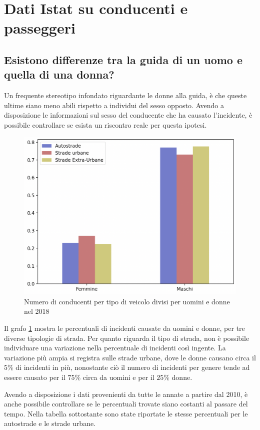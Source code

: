 \documentclass[a4paper,12pt]{report}
\begin{document}
\section{Dati Istat su conducenti e passeggeri}

\subsection{Esistono differenze tra la guida di un uomo e quella di una donna?}

Un frequente stereotipo infondato riguardante le donne alla guida, è che queste 
ultime siano meno abili rispetto a individui del sesso opposto. 
Avendo a disposizione le informazioni sul sesso del conducente che ha causato l'incidente, 
è possibile controllare se esista un riscontro reale per questa ipotesi.

\begin{figure}
    \hfill\includegraphics[width=0.7\linewidth]{../src/incidenti/incidenti_senza_coords/tipo_veicoli/uomo-donna.png}\hspace*{\fill}
    \caption{Numero di conducenti per tipo di veicolo divisi per uomini e donne nel 2018}
    \label{fig:differenza-uomo-donna}
\end{figure}

Il grafo \ref{fig:differenza-uomo-donna} mostra le percentuali di incidenti causate 
da uomini e donne, per tre diverse tipologie di strada. 
Per quanto riguarda il tipo di strada, non è possibile individuare una 
variazione nella percentuale di incidenti così ingente. 
La variazione più ampia si registra sulle strade urbane, dove le donne causano circa il 
$5$\% di incidenti in più, nonostante ciò il numero 
di incidenti per genere tende ad essere causato per il $75$\% circa da uomini e 
per il $25$\% donne.

Avendo a disposizione i dati provenienti da tutte le annate a partire dal 2010, 
è anche possibile controllare se le percentuali trovate siano costanti al 
passare del tempo.
Nella tabella sottostante sono state riportate le stesse percentuali per le 
autostrade e le strade urbane.
\end{document}
